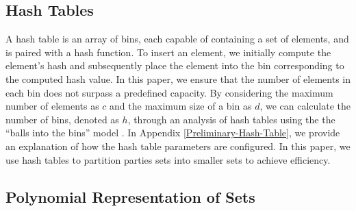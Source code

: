 
\vspace{-3mm}



\vspace{-4mm}

\subsection{Hash Tables}
\vspace{-1.4mm}

A hash table is an array of bins, each capable of containing a set of elements, and is paired with a hash function. To insert an element, we initially compute the element's hash and subsequently place the element into the bin corresponding to the computed hash value. In this paper, we ensure that the number of elements in each bin does not surpass a predefined capacity. By considering the maximum number of elements as $c$ and the maximum size of a bin as $d$, we can calculate the number of bins, denoted as $h$, through an analysis of hash tables using the the ``balls into the bins'' model  \cite{DBLP:conf/stoc/BerenbrinkCSV00}. In Appendix \ref{Preliminary-Hash-Table}, we provide an explanation of how the hash table parameters are configured. In this paper, we use hash tables to partition parties sets into smaller sets to achieve efficiency.




\vspace{-4.2mm}



\vspace{-4.5mm}

\subsection{Polynomial Representation of Sets}\label{sec::poly-rep}
\vspace{-1mm}

